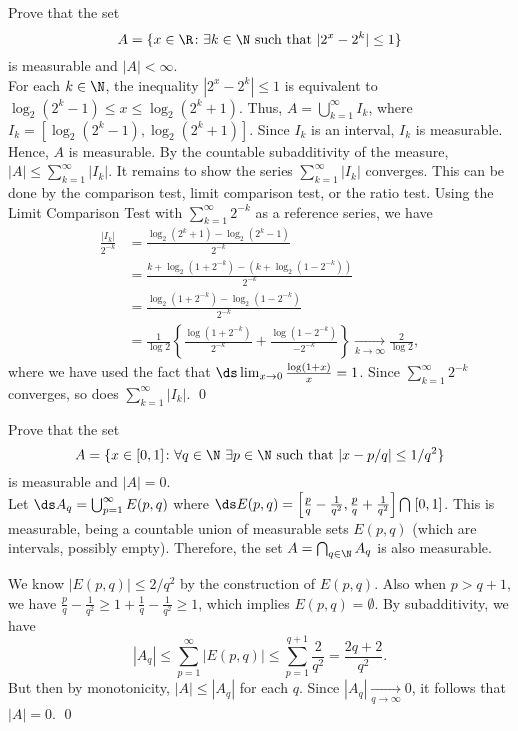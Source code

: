 \begin{hwsol}
Prove that the set
	\[
	A= \{ x \in \R \colon \exists k \in \N \text{ such that } |2^x-2^k| \leq 1 \}
	\]
is measurable and $|A| < \infty$. \\

\pf For each $k \in \N$, the inequality $|2^x-2^k|\le 1$ is equivalent to $\log_2(2^k-1) \leq x \leq \log_2(2^k+1)$. Thus, $A=\bigcup_{k=1}^\infty I_k$, where $I_k = [\log_2(2^k-1),  \log_2(2^k+1)]$. Since $I_k$ is an interval, $I_k$ is measurable. Hence, $A$ is measurable. By the countable subadditivity of the measure, $|A| \leq \sum_{k=1}^\infty |I_k|$. It remains to show the series $\sum_{k=1}^\infty |I_k|$ converges. This can be done by the comparison test, limit comparison test, or the ratio test. Using the Limit Comparison Test with $\sum_{k=1}^\infty 2^{-k}$ as a reference series, we have
	\[
	\begin{split}
	\frac{|I_k|}{2^{-k}} & = \frac{\log_2(2^k+1) -  \log_2(2^k-1)}{2^{-k}} \\ 
	&= \frac{k + \log_2(1+2^{-k}) -  (k+\log_2(1-2^{-k}))}{2^{-k}} \\ 
	&= \frac{\log_2(1+2^{-k}) -  \log_2(1-2^{-k})}{2^{-k}} \\ 
	&= \frac{1}{\log 2}\left\{ \frac{\log(1+2^{-k})}{2^{-k}} +  \frac{\log(1-2^{-k})}{-2^{-k}}\right\} \xrightarrow[k\to\infty]{} \frac{2}{\log 2},
	\end{split}
	\]
where we have used the fact that $\ds\lim_{x\to 0}\frac{\log(1+x)}{x}= 1$. Since $\sum_{k=1}^\infty 2^{-k}$ converges, so does $\sum_{k=1}^\infty |I_k|$. \qed \\
\end{hwsol}


\begin{hwsol}
Prove that the set
	\[
	A = \{x\in [0, 1] \colon \forall q\in \N \ \exists p\in\N \text{ such that } |x-p/q|\le 1/q^2\}
	\]
is measurable and $|A|=0$. \\

\pf Let $\ds A_q= \bigcup_{p=1}^\infty  E(p, q)$ where $\ds E(p, q) = \left[ \frac{p}{q} - \frac{1}{q^2}, \frac{p}{q} + \frac{1}{q^2} \right] \bigcap \; [0,1] $. This is measurable, being a countable union of measurable sets $E(p, q)$ (which are intervals, possibly empty). Therefore, the set $A=\bigcap_{q \in \N}A_q$ is also measurable. 

We know $|E(p, q)|\le 2/q^2$ by the construction of $E(p, q)$. Also when $p > q+1$, we have $\frac{p}{q} - \frac{1}{q^2}\ge 1+  \frac{1}{q}-\frac{1}{q^2} \ge 1$, which implies $E(p, q) = \emptyset$. By subadditivity, we have 
	\[
	|A_q| \le \sum_{p=1}^\infty |E(p, q)| \le \sum_{p=1}^{q+1} \frac{2}{q^2}= \frac{2q+2}{q^2}.
	 \]
But then by monotonicity, $|A| \leq |A_q|$ for each $q$. Since $|A_q| \xrightarrow[q\to\infty]{} 0$, it follows that $|A|=0$. \qed \\
\end{hwsol}


